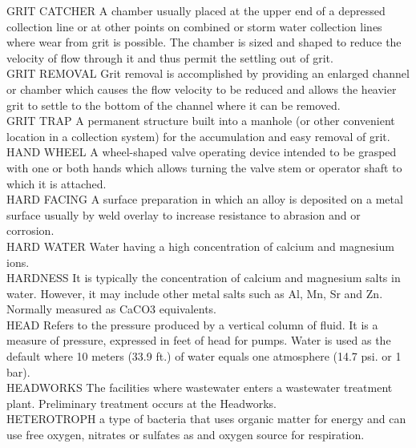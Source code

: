 \documentclass{article}
\begin{document}
GRIT CATCHER
A chamber usually placed at the upper end of a depressed collection line or at other points on combined or storm water collection lines where wear from grit is possible. The chamber is sized and shaped to reduce the velocity of flow through it and thus permit the settling out of grit. 
\vspace{0.3cm}\\
GRIT REMOVAL
Grit removal is accomplished by providing an enlarged channel or chamber which causes the flow velocity to be reduced and allows the heavier grit to settle to the bottom of the channel where it can be removed.
\vspace{0.3cm}\\
GRIT TRAP
A permanent structure built into a manhole (or other convenient location in a collection system) for the accumulation and easy removal of grit. 
\vspace{0.3cm}\\
HAND WHEEL
A wheel-shaped valve operating device intended to be grasped with one or both hands which allows turning the valve stem or operator shaft to which it is attached.
\vspace{0.3cm}\\
HARD FACING
A surface preparation in which an alloy is deposited on a metal surface usually by weld overlay to increase resistance to abrasion and or corrosion.
\vspace{0.3cm}\\
HARD WATER
Water having a high concentration of calcium and magnesium ions.
\vspace{0.3cm}\\
HARDNESS
It is typically the concentration of calcium and magnesium salts in water. However, it may include other metal salts such as Al, Mn, Sr and Zn. Normally measured as CaCO3 equivalents.
\vspace{0.3cm}\\
HEAD
Refers to the pressure produced by a vertical column of fluid.  It is a measure of pressure, expressed in feet of head for pumps. Water is used as the default where 10 meters (33.9 ft.) of water equals one atmosphere (14.7 psi. or 1 bar).
\vspace{0.3cm}\\
HEADWORKS
The facilities where wastewater enters a wastewater treatment plant. Preliminary treatment occurs at the Headworks.
\vspace{0.3cm}\\
HETEROTROPH
a type of bacteria that uses organic matter for energy and can use free oxygen, nitrates or sulfates as and oxygen source for respiration.
\end{document}
